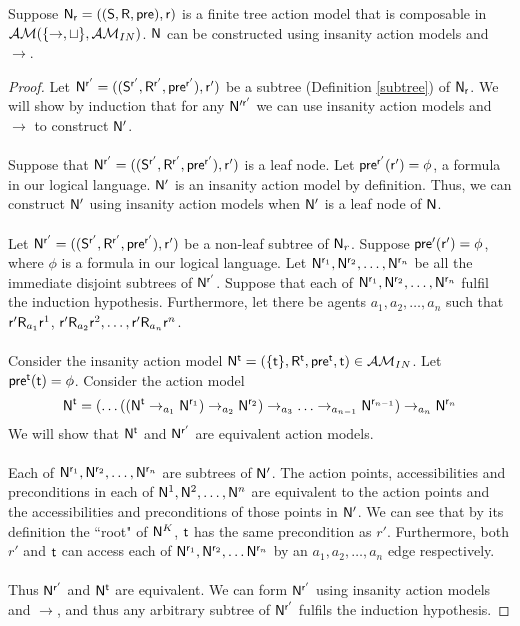 \begin{lemma} \label{finTreeConstruct}
Suppose $\evM_\evr = ((\evS, \evR, \evpr), \evr)$ is a finite tree action model that is composable
in $\EM(\{\to, \sqcup\}, \insaneClass)$.
$\evM$ can be constructed using insanity action models and $\to$.
\end{lemma}
\begin{proof}
Let $\evM^{\evr'} = ((\evS^{\evr'}, \evR^{\evr'}, \evpr^{\evr'}), \evr')$ be a subtree (Definition
\ref{subtree}) of $\evM_\evr$.
We will show by induction that for any $\evM'^{\evr'}$ we can use insanity action models and $\to$ to
construct $\evM'$.\\
\\
Suppose that $\evM^{\evr'} = ((\evS^{\evr'}, \evR^{\evr'}, \evpr^{\evr'}), \evr')$ is a leaf node.
Let $\evpr^{\evr'}(\evr') = \phi$, a formula in our logical language.
$\evM'$ is an insanity action model by definition.
Thus, we can construct $\evM'$ using insanity action models when $\evM'$ is a leaf node of $\evM$.\\
\\
Let $\evM^{\evr'} = ((\evS^{\evr'}, \evR^{\evr'}, \evpr^{\evr'}), \evr')$ be a non-leaf subtree of
$\evM_r$.
Suppose $\evpr'(\evr') = \phi$, where $\phi$ is a formula in our logical language.
Let $\evM^{\evr_1}, \evM^{\evr_2}, \ldots, \evM^{\evr_n}$ be all the immediate disjoint subtrees of
$\evM^{\evr'}$.
Suppose that each of $\evM^{\evr_1}, \evM^{\evr_2}, \ldots, \evM^{\evr_n}$ fulfil the induction hypothesis.
Furthermore, let there be agents $a_1, a_2, \ldots, a_n$ such that $\evr' \evR_{a_1} \evr^1$, $\evr'
\evR_{a_2} \evr^2, \ldots, \evr' \evR_{a_n} \evr^n$.\\
\\
Consider the insanity action model $\evM^\evt = (\{ \evt \}, \evR^\evt, \evpr^\evt, \evt) \in \insaneClass$.
Let $\evpr^\evt(\evt) = \phi$.
Consider the action model 
\[
	\evM^\evt = (\ldots((\evM^\evt \to_{a_1} \evM^{\evr_1}) \to_{a_2} \evM^{\evr_2}) \to_{a_3} \ldots
	\to_{a_{n-1}} \evM^{\evr_{n-1}} ) \to_{a_n} \evM^{\evr_n}
\]
We will show that $\evM^\evt$ and $\evM^{\evr'}$ are equivalent action models.\\
\\
Each of $\evM^{\evr_1}, \evM^{\evr_2}, \ldots, \evM^{\evr_n}$ are subtrees of $\evM'$.
The action points, accessibilities and preconditions in each of $\evM^1, \evM^2, \ldots, \evM^n$ are
equivalent to the action points and the accessibilities and preconditions of those points in $\evM'$.
We can see that by its definition the ``root" of $\evM^K$, $\evt$ has the same precondition as $r'$.
Furthermore, both $r'$ and $\evt$ can access each of $\evM^{\evr_1}, \evM^{\evr_2}, \ldots
\evM^{\evr_n}$ by an $a_1, a_2, \ldots, a_n$ edge
respectively.\\
\\
Thus $\evM^{\evr'}$ and $\evM^\evt$ are equivalent.
We can form $\evM^{\evr'}$ using insanity action models and $\to$, and thus any arbitrary subtree of
$\evM^{\evr'}$
fulfils the induction hypothesis.
\end{proof}

